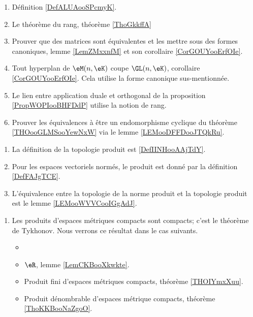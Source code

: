     \begin{enumerate}
        \item Définition \ref{DefALUAooSPcmyK}.
        \item Le théorème du rang, théorème \ref{ThoGkkffA}
        \item Prouver que des matrices sont équivalentes et les mettre sous des formes canoniques, lemme \ref{LemZMxxnfM} et son corollaire \ref{CorGOUYooErfOIe}.
        \item Tout hyperplan de \( \eM(n,\eK)\) coupe \( \GL(n,\eK)\), corollaire \ref{CorGOUYooErfOIe}. Cela utilise la forme canonique sus-mentionnée.
        \item Le lien entre application duale et orthogonal de la proposition \ref{PropWOPIooBHFDdP} utilise la notion de rang.
        \item Prouver les équivalences à être un endomorphisme cyclique du théorème \ref{THOooGLMSooYewNxW} via le lemme \ref{LEMooDFFDooJTQkRu}.
        \end{enumerate}

    \begin{enumerate}
        \item
            La définition de la topologie produit est \ref{DefIINHooAAjTdY}.
        \item
            Pour les espaces vectoriels normés, le produit est donné par la définition \ref{DefFAJgTCE}.
        \item
            L'équivalence entre la topologie de la norme produit et la topologie produit est le lemme \ref{LEMooWVVCooIGgAdJ}.
        \end{enumerate}

    \begin{enumerate}
    \item
        Les produits d'espaces métriques compacts sont compacts; c'est le théorème de Tykhonov. Nous verrons ce résultat dans le cas suivants.
        \begin{itemize}
            \item 
    \item
         \( \eR\), lemme \ref{LemCKBooXkwkte}.
    \item
        Produit fini d'espaces métriques compacts, théorème \ref{THOIYmxXuu}.
    \item
        Produit dénombrable d'espaces métrique compacts, théorème \ref{ThoKKBooNaZgoO}.
        \end{itemize}
    \end{enumerate}

